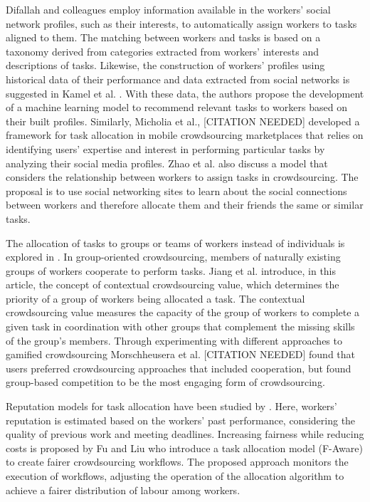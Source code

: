 Difallah and colleagues \cite{difallah2013pick} employ information available in the workers' social network profiles, such as their interests, to automatically assign workers to tasks aligned to them. The matching between workers and tasks is based on a taxonomy derived from categories extracted from workers' interests and descriptions of tasks. Likewise, the construction of workers' profiles using historical data of their performance and data extracted from social networks is suggested in Kamel et al. \cite{kamel2020tasks}. With these data, the authors propose the development of a machine learning model to recommend relevant tasks to workers based on their built profiles. Similarly, Micholia et al., [CITATION NEEDED] developed a framework for task allocation in mobile crowdsourcing marketplaces that relies on identifying users' expertise and interest in performing particular tasks by analyzing their social media profiles. Zhao et al. \cite{zhao2019task} also discuss a model that considers the relationship between workers to assign tasks in crowdsourcing. The proposal is to use social networking sites to learn about the social connections between workers and therefore allocate them and their friends the same or similar tasks.

The allocation of tasks to groups or teams of workers instead of individuals is explored in \cite{jiang2019group}. In group-oriented crowdsourcing, members of naturally existing groups of workers cooperate to perform tasks. Jiang et al. introduce, in this article, the concept of contextual crowdsourcing value, which determines the priority of a group of workers being allocated a task. The contextual crowdsourcing value measures the capacity of the group of workers to complete a given task in coordination with other groups that complement the missing skills of the group's members. Through experimenting with different approaches to gamified crowdsourcing Morschheusera et al. [CITATION NEEDED] found that users preferred crowdsourcing approaches that included cooperation, but found group-based competition to be the most engaging form of crowdsourcing.  

Reputation models for task allocation have been studied by \cite{yu2013bringing}. Here, workers' reputation is estimated based on the workers' past performance, considering the quality of previous work and meeting deadlines. Increasing fairness while reducing costs is proposed by Fu and Liu \cite{fu2021fairness} who introduce a task allocation model (F-Aware) to create fairer crowdsourcing workflows. The proposed approach monitors the execution of workflows, adjusting the operation of the allocation algorithm to achieve a fairer distribution of labour among workers.

